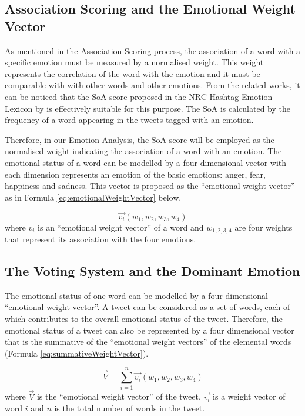 \subsection{Association Scoring and the Emotional Weight Vector}
As mentioned in the Association Scoring process, the association of a word with a specific emotion must be measured by a normalised weight. This weight represents the correlation of the word with the emotion and it must be comparable with with other words and other emotions. From the related works, it can be noticed that the SoA score proposed in the NRC Hashtag Emotion Lexicon by \citet{mohammad2014using} is effectively suitable for this purpose. The SoA is calculated by the frequency of a word appearing in the tweets tagged with an emotion. 

Therefore, in our Emotion Analysis, the SoA score will be employed as the normalised weight indicating the association of a word with an emotion. The emotional status of a word can be modelled by a four dimensional vector with each dimension represents an emotion of the basic emotions: anger, fear, happiness and sadness. This vector is proposed as the ``emotional weight vector'' as in Formula \ref{eq:emotionalWeightVector} below.

\begin{equation}
\label{eq:emotionalWeightVector}
	\vec{v_i}(w_1, w_2, w_3, w_4)
\end{equation}
where \(v_i\) is an ``emotional weight vector'' of a word and \(w_{1,2,3,4}\) are four weights that represent its association with the four emotions.

\subsection{The Voting System and the Dominant Emotion}
The emotional status of one word can be modelled by a four dimensional ``emotional weight vector''. A tweet can be considered as a set of words, each of which contributes to the overall emotional status of the tweet. Therefore, the emotional status of a tweet can also be represented by a four dimensional vector that is the summative of the ``emotional weight vectors'' of the elemental words (Formula \ref{eq:summativeWeightVector}).

\begin{equation}
\label{eq:summativeWeightVector}
	\vec{V} = \sum_{i=1}^{n} \vec{v_i}(w_1, w_2, w_3, w_4)
\end{equation}
where \(\vec{V}\) is the ``emotional weight vector'' of the tweet, \(\vec{v_i}\) is a weight vector of word \(i\) and \(n\) is the total number of words in the tweet.

